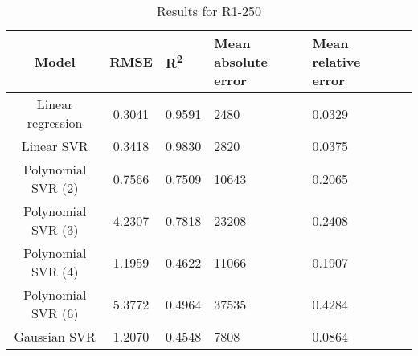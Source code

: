 \begin{table}[H]
\centering
\begin{adjustbox}{center}
\begin{tabular}{c | c M{1.2cm} M{2.5cm} M{2.5cm} M{1.8cm}}
Model & RMSE & R\textsuperscript{2} & Mean absolute error & Mean relative error \tabularnewline
\hline
Linear regression & 0.3041 & 0.9591 &   2480 & 0.0329 \\
Linear SVR & 0.3418 & 0.9830 &   2820 & 0.0375 \\
Polynomial SVR (2) & 0.7566 & 0.7509 &  10643 & 0.2065 \\
Polynomial SVR (3) & 4.2307 & 0.7818 &  23208 & 0.2408 \\
Polynomial SVR (4) & 1.1959 & 0.4622 &  11066 & 0.1907 \\
Polynomial SVR (6) & 5.3772 & 0.4964 &  37535 & 0.4284 \\
Gaussian SVR & 1.2070 & 0.4548 &   7808 & 0.0864 \\
\end{tabular}
\end{adjustbox}
\\
\caption{Results for R1-250}
\label{tab:coreonly_linear_R1_250}
\end{table}

